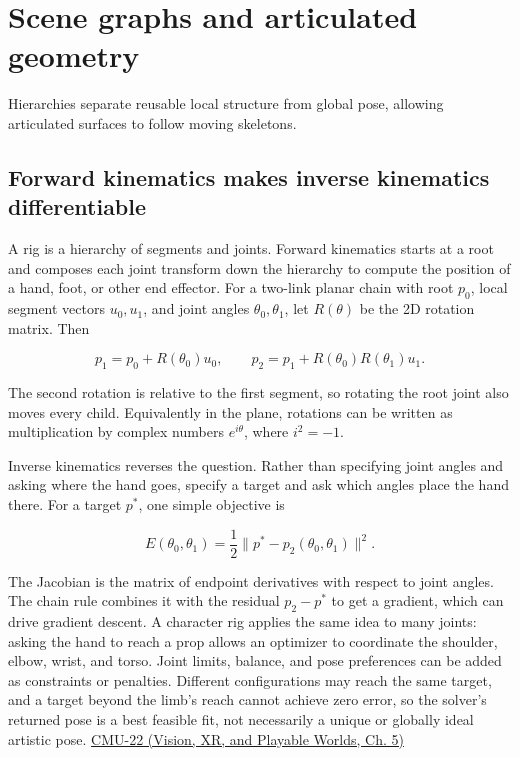 \section{Scene graphs and articulated geometry}\label{04-visual-computing-ii-ch029-scene-graphs-and-articulated-geometry}

Hierarchies separate reusable local structure from global pose, allowing articulated surfaces to follow moving skeletons.

\subsection{Forward kinematics makes inverse kinematics differentiable}\label{04-visual-computing-ii-ch029-forward-kinematics-makes-inverse-kinematics-differentiable}

A rig is a hierarchy of segments and joints. Forward kinematics starts at a root and composes each joint transform down the hierarchy to compute the position of a hand, foot, or other end effector. For a two-link planar chain with root \(p_0\), local segment vectors \(u_0,u_1\), and joint angles \(\theta_0,\theta_1\), let \(R(\theta)\) be the 2D rotation matrix. Then

\[
p_1=p_0+R(\theta_0)u_0,\qquad
p_2=p_1+R(\theta_0)R(\theta_1)u_1.
\]

The second rotation is relative to the first segment, so rotating the root joint also moves every child. Equivalently in the plane, rotations can be written as multiplication by complex numbers \(e^{i\theta}\), where \(i^2=-1\).

Inverse kinematics reverses the question. Rather than specifying joint angles and asking where the hand goes, specify a target and ask which angles place the hand there. For a target \(p^*\), one simple objective is

\[
E(\theta_0,\theta_1)=\frac12\|p^*-p_2(\theta_0,\theta_1)\|^2.
\]

The Jacobian is the matrix of endpoint derivatives with respect to joint angles. The chain rule combines it with the residual \(p_2-p^*\) to get a gradient, which can drive gradient descent. A character rig applies the same idea to many joints: asking the hand to reach a prop allows an optimizer to coordinate the shoulder, elbow, wrist, and torso. Joint limits, balance, and pose preferences can be added as constraints or penalties. Different configurations may reach the same target, and a target beyond the limb's reach cannot achieve zero error, so the solver's returned pose is a best feasible fit, not necessarily a unique or globally ideal artistic pose. \href{../07-Vision-XR-and-Playable-Worlds/main.pdf\#nameddest=04-visual-computing-ii-ch036-cmu-22---optimization}{CMU-22 (Vision, XR, and Playable Worlds, Ch. 5)}


